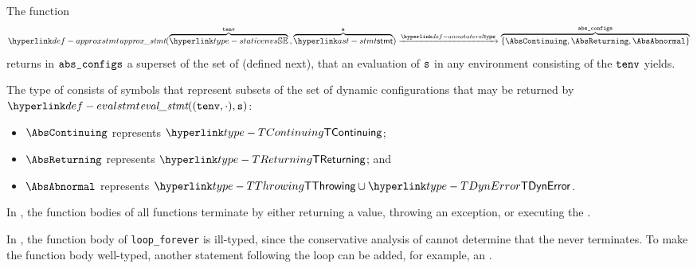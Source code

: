 \FormallyParagraph
\begin{mathpar}
\end{mathpar}

\begin{mathpar}
\end{mathpar}

\begin{mathpar}
\end{mathpar}

\hypertarget{def-approxstmt}{}
The function
\[
  \approxstmt(\overname{\staticenvs}{\tenv} \aslsep \overname{\stmt}{\vs})
  \typearrow\overname{\{\AbsContinuing, \AbsReturning, \AbsAbnormal\}}{\absconfigs}
\]
returns in $\absconfigs$ a superset of the set of \Proseabstractconfigurations{} (defined next),
that an evaluation of $\vs$ in any environment consisting of the \staticenvironmentterm{} $\tenv$ yields.

The type 
of \emph{\Proseabstractconfigurations{}} consists of symbols that represent
subsets of the set of dynamic configurations that may be returned by
$\evalstmt((\tenv, \cdot), \vs)$:
\begin{itemize}
  \item $\AbsContinuing$ represents $\TContinuing$;
  \item $\AbsReturning$ represents $\TReturning$; and
  \item $\AbsAbnormal$ represents $\TThrowing \cup \TDynError$.
\end{itemize}

In , the function bodies of all functions
terminate by either returning a value, throwing an exception, or executing
the \unreachablestatementterm.

In , the function body of \verb|loop_forever|
is ill-typed, since the conservative analysis of 
cannot determine that the \whilestatementterm{} never terminates.
To make the function body well-typed, another statement following the loop
can be added, for example, an \unreachablestatementterm.

